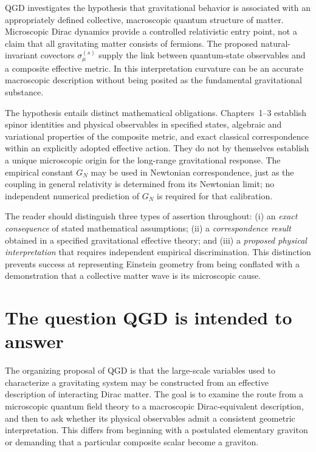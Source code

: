 \documentclass[11pt,a4paper]{article}
\begin{document}
QGD investigates the hypothesis that gravitational behavior is associated
with an appropriately defined collective, macroscopic quantum structure of
matter.  Microscopic Dirac dynamics provide a controlled relativistic entry
point, not a claim that all gravitating matter consists of fermions.  The
proposed natural-invariant covectors $\sigma_\mu^{(s)}$ supply the link between
quantum-state observables and a composite effective metric.  In this
interpretation curvature can be an accurate macroscopic description without
being posited as the fundamental gravitational substance.

The hypothesis entails distinct mathematical obligations.  Chapters~1--3
establish spinor identities and physical observables in specified states,
algebraic and variational properties of the composite metric, and exact
classical correspondence within an explicitly adopted effective action.
They do not by themselves establish a unique microscopic origin for the
long-range gravitational response.  The empirical constant $G_N$ may be
used in Newtonian correspondence, just as the coupling in general
relativity is determined from its Newtonian limit; no independent numerical
prediction of $G_N$ is required for that calibration.

The reader should distinguish three types of assertion throughout:
(i) an \emph{exact consequence} of stated mathematical assumptions;
(ii) a \emph{correspondence result} obtained in a specified gravitational
effective theory; and (iii) a \emph{proposed physical interpretation} that
requires independent empirical discrimination.  This distinction prevents
success at representing Einstein geometry from being conflated with a
demonstration that a collective matter wave is its microscopic cause.

\section{The question QGD is intended to answer}\label{sec:mission}
The organizing proposal of QGD is that the large-scale variables used to characterize a gravitating system may be constructed from an effective description of interacting Dirac matter. The goal is to examine the route from a microscopic quantum field theory to a macroscopic Dirac-equivalent description, and then to ask whether its physical observables admit a consistent geometric interpretation. This differs from beginning with a postulated elementary graviton or demanding that a particular composite scalar become a graviton.
\end{document}
